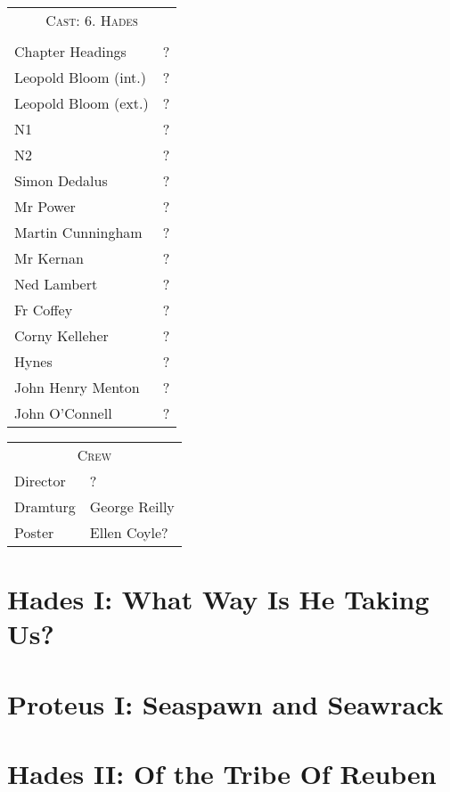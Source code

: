 \begin{tabular}{lp{10cm}}
    \multicolumn{2}{c}{\Large \textsc{Cast: 6. Hades}} \\
\\
Chapter Headings  & ?\\
Leopold Bloom (int.)  & ?\\
Leopold Bloom (ext.)  & ?\\
N1  & ?\\
N2  & ?\\
Simon Dedalus  & ?\\
Mr Power  & ?\\
Martin Cunningham  & ?\\
Mr Kernan  & ?\\
Ned Lambert  & ?\\
Fr Coffey  & ?\\
Corny Kelleher  & ?\\
Hynes  & ?\\
John Henry Menton  & ?\\
John O'Connell  & ?\\
\end{tabular}

\bigskip
\bigskip
\bigskip

\begin{tabular}{lp{10cm}}
    \multicolumn{2}{c}{\Large \textsc{Crew}} \\
Director & ? \\
Dramturg & George Reilly \\
Poster & Ellen Coyle? \\
\end{tabular}
\thispagestyle{empty}

\newpage


\setcounter{page}{1}

\section*{Hades I: What Way Is He Taking Us?}


\section*{Proteus I: Seaspawn and Seawrack}


\section*{Hades II: Of the Tribe Of Reuben}


